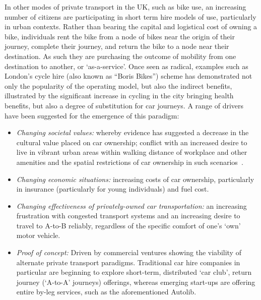 \documentclass[journal]{IEEEtran}
\begin{document}
In other modes of private transport in the UK, such as bike use, an
increasing number of citizens are participating in short term hire
models of use, particularly in urban contexts. Rather than bearing the
capital and logistical cost of owning a bike, individuals rent the
bike from a node of bikes near the origin of their journey, complete
their journey, and return the bike to a node near their
destination. As such they are purchasing the outcome of mobility from
one destination to another, or `as-a-service'. Once seen as radical,
examples such as London’s cycle hire (also known as ``Boris Bikes'')
scheme has demonstrated not only the popularity of the operating
model, but also the indirect benefits, illustrated by the significant
increase in cycling in the city bringing health benefits, but also a
degree of substitution for car journeys. A range of drivers have been
suggested for the emergence of this paradigm:

\begin{itemize}
\item {\emph{Changing societal values:}} whereby evidence has
suggested a decrease in the cultural value placed on car ownership;
conflict with an increased desire to live in vibrant urban areas
within walking distance of workplace and other amenities and the
spatial restrictions of car ownership in such
scenarios~\cite{jenks+burgess:2011}.
\item {\emph{Changing economic situations:}} increasing costs of car
ownership, particularly in insurance (particularly for young
individuals) and fuel cost.
\item {\emph{Changing effectiveness of privately-owned car
transportation:}} an increasing frustration with congested transport
systems and an increasing desire to travel to A-to-B reliably,
regardless of the specific comfort of one's `own' motor vehicle.
\item {\emph{Proof of concept:}} Driven by commercial ventures
showing the viability of alternate private transport
paradigms. Traditional car hire companies in particular are beginning
to explore short-term, distributed `car club', return journey
(`A-to-A' journeys) offerings, whereas emerging start-ups are offering
entire by-leg services, such as the aforementioned Autolib.
\end{itemize}

\end{document}
